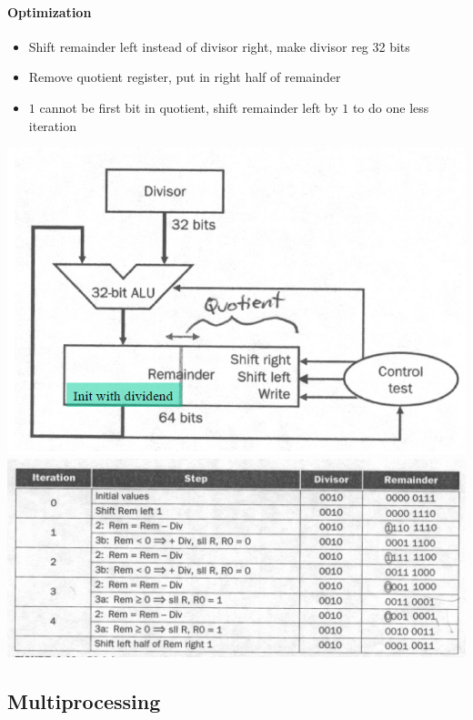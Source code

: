 \documentclass[12 pt]{article}
\begin{document}
\paragraph{Optimization}
\begin{itemize}
\item  Shift remainder left instead of divisor right, make divisor reg 32 bits
\item Remove quotient register, put in right half of remainder
\item $1$ cannot be first bit in quotient, shift remainder left by $1$ to do one less iteration
\end{itemize}
\includegraphics[scale=0.6]{dvi}
\\ \includegraphics[scale=0.3]{dvix}
\subsection{Multiprocessing}
\end{document}
